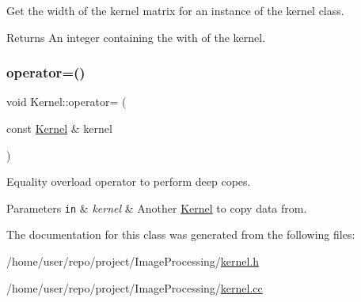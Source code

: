 Get the width of the kernel matrix for an instance of the kernel class. 

\begin{DoxyReturn}{Returns}
An integer containing the with of the kernel. 
\end{DoxyReturn}
\mbox{\label{classKernel_a82c66f7c3d498d40dbab93e81fd94402}} 
\subsubsection{\texorpdfstring{operator=()}{operator=()}}
{\footnotesize\ttfamily void Kernel\+::operator= (\begin{DoxyParamCaption}\item[{const \hyperlink{classKernel}{Kernel} \&}]{kernel }\end{DoxyParamCaption})}



Equality overload operator to perform deep copes. 


\begin{DoxyParams}[1]{Parameters}
\mbox{\tt in}  & {\em kernel} & Another \hyperlink{classKernel}{Kernel} to copy data from. \\
\hline
\end{DoxyParams}


The documentation for this class was generated from the following files\+:\begin{DoxyCompactItemize}
\item 
/home/user/repo/project/\+Image\+Processing/\hyperlink{kernel_8h}{kernel.\+h}\item 
/home/user/repo/project/\+Image\+Processing/\hyperlink{kernel_8cc}{kernel.\+cc}\end{DoxyCompactItemize}
